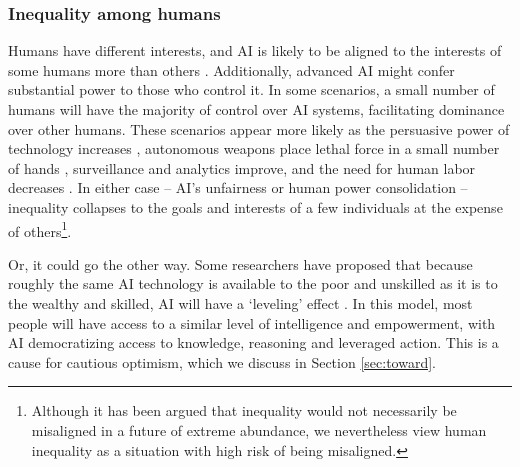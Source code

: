 \documentclass[12pt]{article}
\begin{document}


\subsubsection{Inequality among humans} 

Humans have different interests, and AI is likely to be aligned to the interests of some humans more than others \citep{gabriel2025matter,sorensen2024roadmap,gabriel2020artificial, santurkar2023whose, baum2020social}. Additionally, advanced AI might confer substantial power to those who control it. In some scenarios, a small number of humans will have the majority of control over AI systems, facilitating dominance over other humans. These scenarios appear more likely as the persuasive power of technology increases \citep{woolley2018computational, costello2024durably, hackenburg2025levers}, autonomous weapons place lethal force in a small number of hands \citep{scharre2018army}, surveillance and analytics improve, and the need for human labor decreases \citep{susskind2020world, ford2015rise, drago2025defining}. In either case -- AI's unfairness or human power consolidation -- inequality collapses to the goals and interests of a few individuals at the expense of others\footnote{Although it has been argued that inequality would not necessarily be misaligned in a future of extreme abundance, we nevertheless view human inequality as a situation with high risk of being misaligned.}.


Or, it could go the other way. Some researchers have proposed that because roughly the same AI technology is available to the poor and unskilled as it is to the wealthy and skilled, AI will have a `leveling' effect \citep{noy2023experimental, brynjolfsson2025generative}. In this model, most people will have access to a similar level of intelligence and empowerment, with AI democratizing access to knowledge, reasoning and leveraged action. This is a cause for cautious optimism, which we discuss in Section \ref{sec:toward}.
\end{document}
